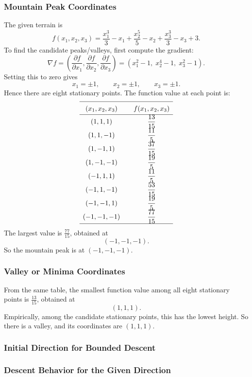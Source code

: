 \documentclass[11pt,a4paper]{article}
\newcommand{\answergap}{\vspace{0.9em}}
\begin{document}
\subsubsection{Mountain Peak Coordinates}
The given terrain is
\[
f(x_1,x_2,x_3)=\frac{x_1^3}{3}-x_1+\frac{x_2^5}{5}-x_2+\frac{x_3^3}{3}-x_3+3.
\]
To find the candidate peaks/valleys, first compute the gradient:
\[
\nabla f =
\left(
\frac{\partial f}{\partial x_1},
\frac{\partial f}{\partial x_2},
\frac{\partial f}{\partial x_3}
\right)
= (x_1^2-1,\;x_2^4-1,\;x_3^2-1).
\]
Setting this to zero gives
\[
x_1=\pm 1, \qquad x_2=\pm 1, \qquad x_3=\pm 1.
\]
Hence there are eight stationary points. The function value at each point is:
\[
\renewcommand{\arraystretch}{1.55}
\begin{array}{c@{\qquad}c}
\hline
(x_1,x_2,x_3) & f(x_1,x_2,x_3) \\
\hline
(1,1,1) & \dfrac{13}{15} \\
(1,1,-1) & \dfrac{11}{5} \\
(1,-1,1) & \dfrac{37}{15} \\
(1,-1,-1) & \dfrac{19}{5} \\
(-1,1,1) & \dfrac{11}{5} \\
(-1,1,-1) & \dfrac{53}{15} \\
(-1,-1,1) & \dfrac{19}{5} \\
(-1,-1,-1) & \dfrac{77}{15} \\
\hline
\end{array}
\]
The largest value is \(\frac{77}{15}\), obtained at
\[
(-1,-1,-1).
\]
So the mountain peak is at \((-1,-1,-1)\).

\subsubsection{Valley or Minima Coordinates}
From the same table, the smallest function value among all eight stationary points is \(\frac{13}{15}\), obtained at
\[
(1,1,1).
\]
Empirically, among the candidate stationary points, this has the lowest height. So there is a valley, and its coordinates are \((1,1,1)\).

\subsubsection{Initial Direction for Bounded Descent}
\answergap

\subsubsection{Descent Behavior for the Given Direction}
\answergap
\end{document}
